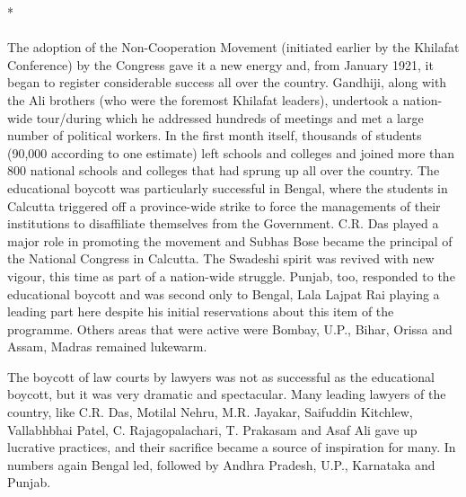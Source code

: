 \begin{center}*\end{center}

\paragraph*{}


The adoption of the Non-Cooperation Movement (initiated earlier by the Khilafat Conference) by the Congress gave it a new energy and, from January 1921, it began to register considerable success all over the country. Gandhiji, along with the Ali brothers (who were the foremost Khilafat leaders), undertook a nation-wide tour/during which he addressed hundreds of meetings and met a large number of political workers. In the first month itself, thousands of students (90,000 according to one estimate) left schools and colleges and joined more than 800 national schools and colleges that had sprung up all over the country. The educational boycott was particularly successful in Bengal, where the students in Calcutta triggered off a province-wide strike to force the managements of their institutions to disaffiliate themselves from the Government. C.R. Das played a major role in promoting the movement and Subhas Bose became the principal of the National Congress in Calcutta. The Swadeshi spirit was revived with new vigour, this time as part of a nation-wide struggle. Punjab, too, responded to the educational boycott and was second only to Bengal, Lala Lajpat Rai playing a leading part here despite his initial reservations about this item of the programme. Others areas that were active were Bombay, U.P., Bihar, Orissa and Assam, Madras remained lukewarm. 

The boycott of law courts by lawyers was not as successful as the educational boycott, but it was very dramatic and spectacular. Many leading lawyers of the country, like C.R. Das, Motilal Nehru, M.R. Jayakar, Saifuddin Kitchlew, Vallabhbhai Patel, C. Rajagopalachari, T. Prakasam and Asaf Ali gave up lucrative practices, and their sacrifice became a source of inspiration for many. In numbers again Bengal led, followed by Andhra Pradesh, U.P., Karnataka and Punjab. 

